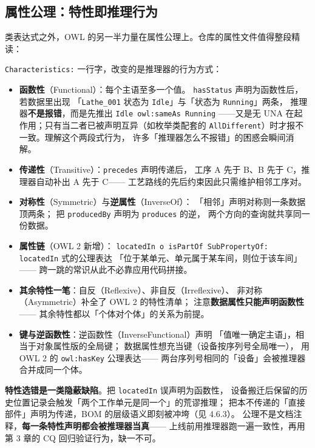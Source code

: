 \subsection{属性公理：特性即推理行为}

类表达式之外，OWL 的另一半力量在属性公理上。仓库的属性文件值得整段精读：



\texttt{Characteristics:} 一行字，改变的是推理器的行为方式：

\begin{itemize}
  \item \textbf{函数性}（Functional）：每个主语至多一个值。
        \texttt{hasStatus} 声明为函数性后，若数据里出现
        「\texttt{Lathe\_001} 状态为 \texttt{Idle}」与「状态为 \texttt{Running}」两条，
        推理器\textbf{不是报错}，而是先推出 \texttt{Idle owl:sameAs Running}
        ——又是无 UNA 在起作用；只有当二者已被声明互异（如枚举类配套的
        \texttt{AllDifferent}）时才报不一致。理解这个两段式行为，
        许多「推理器怎么不报错」的困惑会瞬间消解。
  \item \textbf{传递性}（Transitive）：\texttt{precedes} 声明传递后，
        工序 A 先于 B、B 先于 C，推理器自动补出 A 先于 C——
        工艺路线的先后约束因此只需维护相邻工序对。
  \item \textbf{对称性}（Symmetric）与\textbf{逆属性}（InverseOf）：
        「相邻」声明对称则一条数据顶两条；
        把 \texttt{producedBy} 声明为 \texttt{produces} 的逆，
        两个方向的查询就共享同一份数据。
  \item \textbf{属性链}（OWL 2 新增）：
        \texttt{locatedIn o isPartOf SubPropertyOf: locatedIn} 式的公理表达
        「位于某单元、单元属于某车间，则位于该车间」——
        跨一跳的常识从此不必靠应用代码拼接。
  \item \textbf{其余特性一笔}：自反（Reflexive）、非自反（Irreflexive）、
        非对称（Asymmetric）补全了 OWL 2 的特性清单；
        注意\textbf{数据属性只能声明函数性}——
        其余特性都以「个体对个体」的关系为前提。
  \item \textbf{键与逆函数性}：逆函数性（InverseFunctional）声明
        「值唯一确定主语」，相当于对象属性版的全局键；
        数据属性想充当键（设备按序列号全局唯一），
        用 OWL 2 的 \texttt{owl:hasKey} 公理表达——
        两台序列号相同的「设备」会被推理器合并成同一个体。
\end{itemize}

\begin{noteblock}
\textbf{特性选错是一类隐蔽缺陷}。把 \texttt{locatedIn} 误声明为函数性，
设备搬迁后保留的历史位置记录会触发「两个工作单元是同一个」的荒谬推理；
把本不传递的「直接部件」声明为传递，BOM 的层级语义即刻被冲垮（见 4.6.3）。
公理不是文档注释，\textbf{每一条特性声明都会被推理器当真}——
上线前用推理器跑一遍一致性，再用第 3 章的 CQ 回归验证行为，缺一不可。
\end{noteblock}

